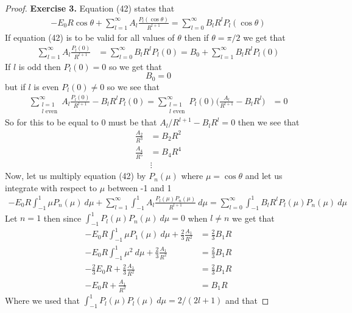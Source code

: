 \documentclass[11pt]{article}
\theoremstyle{definition}
\begin{document}
\cleardoublepage
\begin{proof}{\textbf{Exercise 3.}}
Equation (42) states that
\begin{align*}
    -E_0R\cos\theta + \sum_{l=1}^\infty A_l \frac{P_l(\cos\theta)}{R^{l+1}}
    = \sum_{l=0}^\infty B_lR^lP_l(\cos\theta)
\end{align*}
If equation (42) is to be valid for all values of $\theta$ then if
$\theta = \pi/2$ we get that
\begin{align*}
    \sum_{l=1}^\infty A_l \frac{P_l(0)}{R^{l+1}}
    &= \sum_{l=0}^\infty B_lR^lP_l(0)
    = B_0 + \sum_{l=1}^\infty B_lR^lP_l(0)
\end{align*}
If $l$ is odd then $P_l(0) = 0$ so we get that
$$B_0 = 0$$
but if $l$ is even $P_l(0) \neq 0$ so we see that
\begin{align*}
    \sum_{\substack{l=1\\ l\text{ even}}}^\infty
    A_l \frac{P_l(0)}{R^{l+1}} - B_lR^lP_l(0) = 
    \sum_{\substack{l=1\\ l\text{ even}}}^\infty
    P_l(0)\bigg(\frac{A_l}{R^{l+1}} - B_lR^l\bigg) &= 0
\end{align*}
So for this to be equal to $0$ must be that $A_l/R^{l+1} - B_lR^{l} = 0$ 
then we see that
\begin{align*}
    \frac{A_2}{R^{3}} &= B_2R^2\\
    \frac{A_4}{R^{5}} &= B_4R^4\\
    &\vdots
\end{align*}
Now, let us multiply equation (42) by $P_n(\mu)$ where $\mu =\cos\theta$ and
let us integrate with respect to $\mu$ between -1 and 1
\begin{align*}
    -E_0R\int_{-1}^1\mu P_n(\mu)~d\mu
    + \sum_{l=1}^\infty \int_{-1}^1 A_l \frac{P_l(\mu)P_n(\mu)}{R^{l+1}}~d\mu
    = \sum_{l=0}^\infty \int_{-1}^1 B_lR^lP_l(\mu)P_n(\mu)~d\mu
\end{align*}
Let $n = 1$ then since $\int_{-1}^1 P_l(\mu)P_n(\mu)~d\mu = 0$ when $l \neq n$
we get that
\begin{align*}
    -E_0R\int_{-1}^1\mu P_1(\mu)~d\mu + \frac{2}{3}\frac{A_1}{R^{2}}
    &= \frac{2}{3}B_1R\\
    -E_0R\int_{-1}^1\mu^2~d\mu + \frac{2}{3}\frac{A_1}{R^{2}}
    &= \frac{2}{3}B_1R\\
    -\frac{2}{3}E_0R + \frac{2}{3}\frac{A_1}{R^{2}}
    &= \frac{2}{3}B_1R\\
    -E_0R + \frac{A_1}{R^{2}} &= B_1R
\end{align*}
Where we used that $\int_{-1}^1 P_l(\mu)P_l(\mu)~d\mu = 2/(2l + 1)$ and that

\end{proof}
\end{document}
